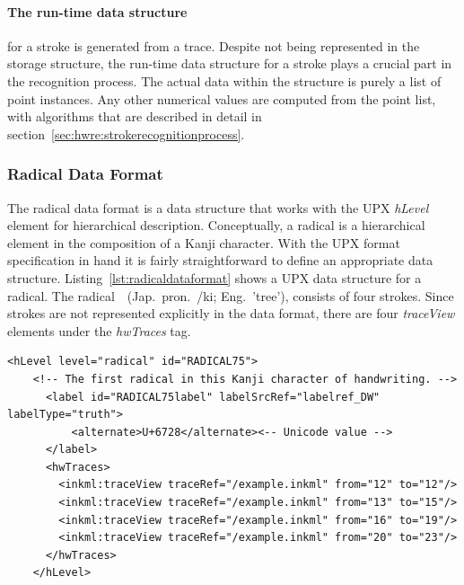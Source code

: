 \paragraph{The run-time data structure} for a stroke is generated from a trace.
Despite not being represented in the storage structure, the run-time data
structure for a stroke plays a crucial part in the recognition process.
The actual data within the structure is purely a list of point instances. 
Any other numerical values are computed from the point list, with algorithms
that are described in detail in 
section~\ref{sec:hwre:strokerecognitionprocess}.

\subsubsection{Radical Data Format}
\label{sec:hwre:radicaldataformat}

The radical data format is a data structure that works with the UPX \emph{hLevel}
element for hierarchical description.
Conceptually, a radical is a hierarchical element in the composition of a Kanji
character. With the UPX format specification in hand it is fairly 
straightforward to define an appropriate data structure.
Listing~\ref{lst:radicaldataformat} shows a UPX data structure for a radical.
The 
radical~~(Jap.\ pron.\ /ki; Eng.\ 'tree'), 
consists of four strokes.
Since strokes are not represented explicitly in the data format,
there are four \emph{traceView} elements under the \emph{hwTraces} tag.
\begin{xmlcode}
  \begin{lstlisting}[emph={hLevel,hwTraces,label,alternative},
                     emphstyle=\color{blue}\textbf,
                     emph={[2]level,labelSrcRef,labelType,traceRef,from,to},
                     emphstyle={[2]\color{red}},
                     caption={A radical representation in UPX},
                     label=lst:radicaldataformat]
    <hLevel level="radical" id="RADICAL75">
    <!-- The first radical in this Kanji character of handwriting. -->
      <label id="RADICAL75label" labelSrcRef="labelref_DW" labelType="truth">
          <alternate>U+6728</alternate><-- Unicode value -->
      </label>
      <hwTraces>
        <inkml:traceView traceRef="/example.inkml" from="12" to="12"/>
        <inkml:traceView traceRef="/example.inkml" from="13" to="15"/>
        <inkml:traceView traceRef="/example.inkml" from="16" to="19"/>
        <inkml:traceView traceRef="/example.inkml" from="20" to="23"/>
      </hwTraces>
    </hLevel>
  \end{lstlisting}
\end{xmlcode}

